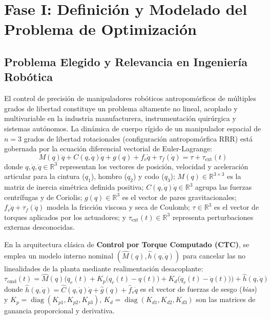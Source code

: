 \documentclass[11pt,a4paper]{article}
\begin{document}
\section{Fase I: Definición y Modelado del Problema de Optimización}

\subsection{Problema Elegido y Relevancia en Ingeniería Robótica}
El control de precisión de manipuladores robóticos antropomórficos de múltiples grados de libertad constituye un problema altamente no lineal, acoplado y multivariable en la industria manufacturera, instrumentación quirúrgica y sistemas autónomos. La dinámica de cuerpo rígido de un manipulador espacial de $n = 3$ grados de libertad rotacionales (configuración antropomórfica RRR) está gobernada por la ecuación diferencial vectorial de Euler-Lagrange:
\begin{equation}
    M(q)\ddot{q} + C(q, \dot{q})\dot{q} + g(q) + f_v\dot{q} + \tau_f(\dot{q}) = \tau + \tau_{\text{ext}}(t)
    \label{eq:lagrange}
\end{equation}
donde $q, \dot{q}, \ddot{q} \in \mathbb{R}^3$ representan los vectores de posición, velocidad y aceleración articular para la cintura ($q_1$), hombro ($q_2$) y codo ($q_3$); $M(q) \in \mathbb{R}^{3\times 3}$ es la matriz de inercia simétrica definida positiva; $C(q,\dot{q})\dot{q} \in \mathbb{R}^3$ agrupa las fuerzas centrífugas y de Coriolis; $g(q) \in \mathbb{R}^3$ es el vector de pares gravitacionales; $f_v\dot{q} + \tau_f(\dot{q})$ modela la fricción viscosa y seca de Coulomb; $\tau \in \mathbb{R}^3$ es el vector de torques aplicados por los actuadores; y $\tau_{\text{ext}}(t) \in \mathbb{R}^3$ representa perturbaciones externas desconocidas.

En la arquitectura clásica de \textbf{Control por Torque Computado (CTC)}, se emplea un modelo interno nominal $(\hat{M}(q), \hat{h}(q,\dot{q}))$ para cancelar las no linealidades de la planta mediante realimentación desacoplante:
\begin{equation}
    \tau_{\text{cmd}}(t) = \hat{M}(q)\Big(\ddot{q}_r(t) + K_p\big(q_r(t) - q(t)\big) + K_d\big(\dot{q}_r(t) - \dot{q}(t)\big)\Big) + \hat{h}(q, \dot{q})
    \label{eq:ctc}
\end{equation}
donde $\hat{h}(q,\dot{q}) = \hat{C}(q,\dot{q})\dot{q} + \hat{g}(q) + \hat{f}_v\dot{q}$ es el vector de fuerzas de sesgo (\textit{bias}) y $K_p = \operatorname{diag}(K_{p1}, K_{p2}, K_{p3})$, $K_d = \operatorname{diag}(K_{d1}, K_{d2}, K_{d3})$ son las matrices de ganancia proporcional y derivativa.
\end{document}
